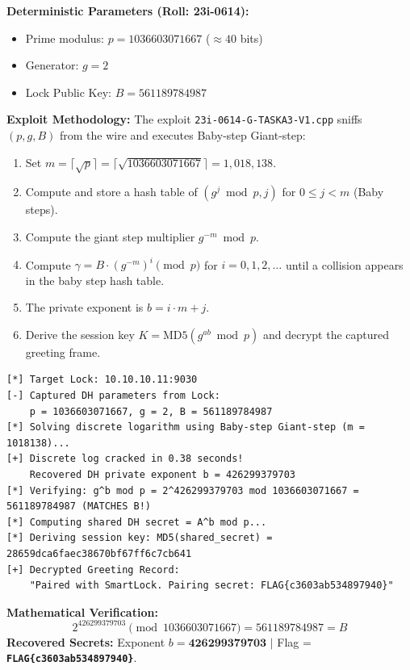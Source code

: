 \documentclass[11pt,a4paper]{article}
\begin{document}
\textbf{Deterministic Parameters (Roll: 23i-0614):}
\begin{itemize}
    \item Prime modulus: $p = 1036603071667$ ($\approx 40$ bits)
    \item Generator: $g = 2$
    \item Lock Public Key: $B = 561189784987$
\end{itemize}

\textbf{Exploit Methodology:}  
The exploit \texttt{23i-0614-G-TASKA3-V1.cpp} sniffs $(p, g, B)$ from the wire and executes Baby-step Giant-step:
\begin{enumerate}
    \item Set $m = \lceil\sqrt{p}\rceil = \lceil\sqrt{1036603071667}\rceil = 1,018,138$.
    \item Compute and store a hash table of $(g^j \bmod p, j)$ for $0 \le j < m$ (Baby steps).
    \item Compute the giant step multiplier $g^{-m} \bmod p$.
    \item Compute $\gamma = B \cdot (g^{-m})^i \pmod p$ for $i = 0, 1, 2, \dots$ until a collision appears in the baby step hash table.
    \item The private exponent is $b = i \cdot m + j$.
    \item Derive the session key $K = \text{MD5}(g^{ab} \bmod p)$ and decrypt the captured greeting frame.
\end{enumerate}

\begin{lstlisting}[caption={Stage A.3 Terminal Output (\texttt{23i-0614-G-TASKA3-V1})}]
[*] Target Lock: 10.10.10.11:9030
[-] Captured DH parameters from Lock:
    p = 1036603071667, g = 2, B = 561189784987
[*] Solving discrete logarithm using Baby-step Giant-step (m = 1018138)...
[+] Discrete log cracked in 0.38 seconds!
    Recovered DH private exponent b = 426299379703
[*] Verifying: g^b mod p = 2^426299379703 mod 1036603071667 = 561189784987 (MATCHES B!)
[*] Computing shared DH secret = A^b mod p...
[*] Deriving session key: MD5(shared_secret) = 28659dca6faec38670bf67ff6c7cb641
[+] Decrypted Greeting Record:
    "Paired with SmartLock. Pairing secret: FLAG{c3603ab534897940}"
\end{lstlisting}

\textbf{Mathematical Verification:}
\[
2^{426299379703} \pmod{1036603071667} = 561189784987 = B
\]
\textbf{Recovered Secrets:} Exponent $b = \mathbf{426299379703}$ $\mid$ Flag = \textbf{\texttt{FLAG\{c3603ab534897940\}}}.
\end{document}
